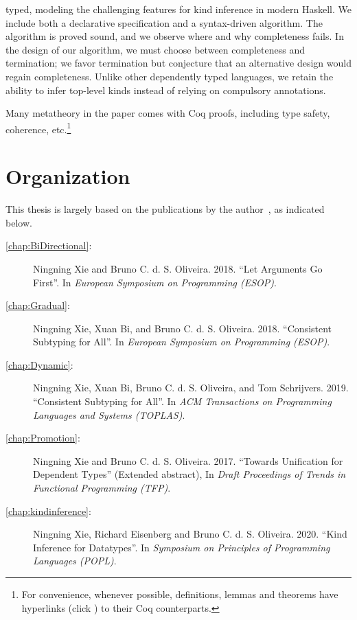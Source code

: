 \begin{description}
\begin{itemize}
\begin{itemize}
      typed, modeling the challenging features for kind inference in modern
      Haskell. We include both a declarative specification and a syntax-driven
      algorithm. The algorithm is proved sound, and we observe where and why
      completeness fails. In the design of our algorithm, we must choose between
      completeness and termination; we favor termination but conjecture that an
      alternative design would regain completeness. Unlike other dependently typed
      languages, we retain the ability to infer top-level kinds instead of relying
      on compulsory annotations.
    \end{itemize}
  \end{itemize}
\end{description}

Many metatheory in the paper comes with Coq proofs, including type safety,
coherence, etc.\footnote{For convenience, whenever possible, definitions, lemmas
  and theorems have hyperlinks (click \leftpointright) to their Coq
  counterparts. }

\section{Organization}

This thesis is largely based on the
publications by the author~\citep{esop2018:arguments,esop2018:consistent,toplas:consistent,popl:kind,tfp},
as indicated below.
\begin{description}
\item[\cref{chap:BiDirectional}:] Ningning Xie and Bruno C. d. S.
  Oliveira. 2018. ``Let Arguments Go First''. In
  \emph{European Symposium on Programming (ESOP)}.
\item[\cref{chap:Gradual}:] Ningning Xie, Xuan Bi, and Bruno C. d. S.
  Oliveira. 2018. ``Consistent Subtyping for All''. In
  \emph{European Symposium on Programming (ESOP)}.
\item[\cref{chap:Dynamic}:] Ningning Xie, Xuan Bi, Bruno C. d. S.
  Oliveira, and Tom Schrijvers. 2019. ``Consistent Subtyping for All''. In
  \emph{ACM Transactions on Programming Languages and Systems (TOPLAS)}.
\item[\cref{chap:Promotion}:]
  Ningning Xie and Bruno C. d. S. Oliveira.
  2017. ``Towards Unification for Dependent Types'' (Extended abstract), In \emph{Draft Proceedings
    of Trends in Functional Programming (TFP)}.
\item[\cref{chap:kindinference}:]
  Ningning Xie, Richard Eisenberg and Bruno C. d. S. Oliveira. 2020. ``Kind
  Inference for Datatypes''. In \emph{Symposium on Principles of Programming
    Languages (POPL)}.
\end{description}


\noindent\makebox[\linewidth]{\rule{0.7\textwidth}{0.4pt}}

\vspace{1.5\baselineskip}



